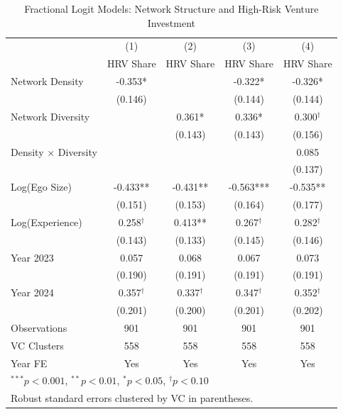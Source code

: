 \begin{table}[htbp]
\centering
\caption{Fractional Logit Models: Network Structure and High-Risk Venture Investment}
\label{tab:main_results}
\begin{tabular}{lcccc}
\hline\hline
 & (1) & (2) & (3) & (4) \\
 & HRV Share & HRV Share & HRV Share & HRV Share \\
\hline
Network Density & -0.353* &  & -0.322* & -0.326* \\
 & (0.146) &  & (0.144) & (0.144) \\[0.5ex]
Network Diversity &  & 0.361* & 0.336* & 0.300$^\dagger$ \\
 &  & (0.143) & (0.143) & (0.156) \\[0.5ex]
Density × Diversity &  &  &  & 0.085 \\
 &  &  &  & (0.137) \\[0.5ex]
Log(Ego Size) & -0.433** & -0.431** & -0.563*** & -0.535** \\
 & (0.151) & (0.153) & (0.164) & (0.177) \\[0.5ex]
Log(Experience) & 0.258$^\dagger$ & 0.413** & 0.267$^\dagger$ & 0.282$^\dagger$ \\
 & (0.143) & (0.133) & (0.145) & (0.146) \\[0.5ex]
Year 2023 & 0.057 & 0.068 & 0.067 & 0.073 \\
 & (0.190) & (0.191) & (0.191) & (0.191) \\[0.5ex]
Year 2024 & 0.357$^\dagger$ & 0.337$^\dagger$ & 0.347$^\dagger$ & 0.352$^\dagger$ \\
 & (0.201) & (0.200) & (0.201) & (0.202) \\[0.5ex]
\hline
Observations & 901 & 901 & 901 & 901 \\
VC Clusters & 558 & 558 & 558 & 558 \\
Year FE & Yes & Yes & Yes & Yes \\
\hline\hline
\multicolumn{5}{l}{\footnotesize $^{***}p<0.001$, $^{**}p<0.01$, $^{*}p<0.05$, $^\dagger p<0.10$} \\
\multicolumn{5}{l}{\footnotesize Robust standard errors clustered by VC in parentheses.} \\
\end{tabular}
\end{table}